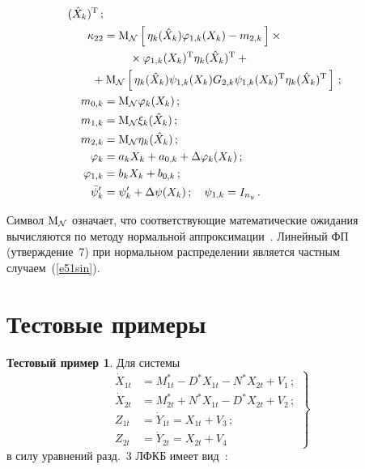 \begin{multicols}{2}
\begin{align*}
(\hat X_k)^{\mathrm{T}}\,;\\ %
\kappa_{22}&=
\mm_{\cal N} \lk \eta_k (\hat X_k) \vrp_{1,k}(X_k) - m_{2,k}\rk\times{}\\
&\hspace*{8mm}{}\times \vrp_{1,k}(X_k)^{\mathrm{T}} \eta_k (\hat X_k)^{\mathrm{T}}+{}\\
&\hspace*{-10.35pt}{}+\mm_{\cal N} \lk \eta_k (\hat X_k) \psi_{1,k}(X_k) G_{2,k} \psi_{1,k} (X_k)^{\mathrm{T}} \eta_k 
(\hat X_k)^{\mathrm{T}}\rk\,;\\ %
m_{0,k} &= \mm_{\cal N} \vrp_k (X_k)\,;\\
m_{1,k} &=\mm_{\cal N} \xi_k (\hat X_k)\,;\\
m_{2,k} &=\mm_{\cal N} \eta_k (\hat X_k)\,;\\
\vrp_k &= a_k X_k + a_{0,k} +\Delta\vrp_k (X_k)\,;\\
\vrp_{1,k} &= b_k X_k +b_{0,k}\,;\\
\bar \psi_k' &=\psi_k' +\Delta \psi (X_k)\,; \quad \psi_{1,k} = I_{n_y}\,.
\end{align*}

Символ $ {\rm M}_{\cal N}$ означает, что соответствующие математические ожидания вычисляются по методу 
нормальной аппроксимации~\cite{3sin, 4sin}.  Линейный ФП (утверждение~7) при нормальном распределении является 
частным случаем~(\ref{e51sin}).

\section{Тестовые примеры}

\noindent
\textbf{Тестовый пример 1}.
Для системы
\begin{equation}
\left.
\begin{array}{rl}
    \dot X_{1t} &= M_{1t}^* - D^* X_{1t} - N^* X_{2t} +V_1\,;\\[6pt]
    \dot X_{2t} &= M_{2t}^* + N^* X_{1t} - D^* X_{2t} +V_2\,;\\[6pt]
    Z_{1t}&=\dot Y_{1t} = X_{1t} + V_3\,;\\[6pt]
Z_{2t} &=\dot Y_{2t} = X_{2t} +V_4
    \end{array}
    \right \}
    \label{e62sin}
\end{equation}
в силу уравнений разд.~3 ЛФКБ имеет вид~\cite{4sin}:


\end{multicols}
